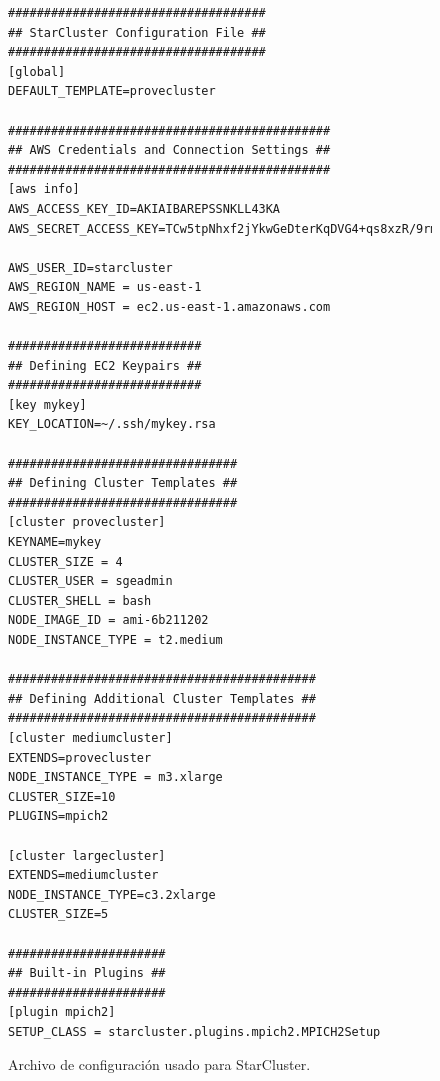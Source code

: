 \documentclass{article}
\begin{document}
\begin{figure}[h]
\centering
\begin{lstlisting}
####################################
## StarCluster Configuration File ##
####################################
[global]
DEFAULT_TEMPLATE=provecluster

#############################################
## AWS Credentials and Connection Settings ##
#############################################
[aws info]
AWS_ACCESS_KEY_ID=AKIAIBAREPSSNKLL43KA
AWS_SECRET_ACCESS_KEY=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

AWS_USER_ID=starcluster
AWS_REGION_NAME = us-east-1
AWS_REGION_HOST = ec2.us-east-1.amazonaws.com

###########################
## Defining EC2 Keypairs ##
###########################
[key mykey]
KEY_LOCATION=~/.ssh/mykey.rsa

################################
## Defining Cluster Templates ##
################################
[cluster provecluster]
KEYNAME=mykey
CLUSTER_SIZE = 4
CLUSTER_USER = sgeadmin
CLUSTER_SHELL = bash
NODE_IMAGE_ID = ami-6b211202
NODE_INSTANCE_TYPE = t2.medium

###########################################
## Defining Additional Cluster Templates ##
###########################################
[cluster mediumcluster]
EXTENDS=provecluster
NODE_INSTANCE_TYPE = m3.xlarge
CLUSTER_SIZE=10
PLUGINS=mpich2

[cluster largecluster]
EXTENDS=mediumcluster
NODE_INSTANCE_TYPE=c3.2xlarge
CLUSTER_SIZE=5

######################
## Built-in Plugins ##
######################
[plugin mpich2]
SETUP_CLASS = starcluster.plugins.mpich2.MPICH2Setup
\end{lstlisting}
\caption{Archivo de configuración usado para StarCluster.}
\label{fig:configfile}
\end{figure}	

\clearpage
\end{document}
